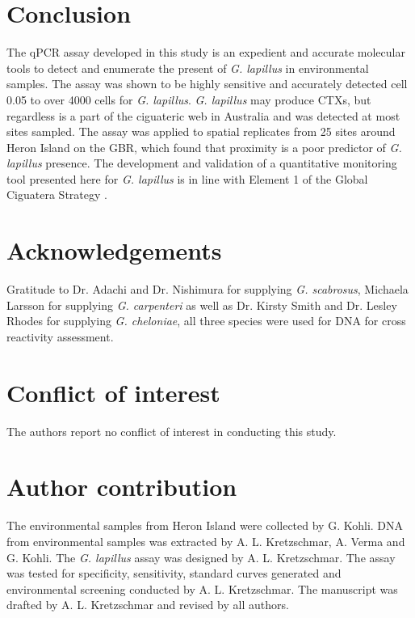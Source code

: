 \documentclass[12pt]{article}
\begin{document}
\section*{Conclusion}
The qPCR assay developed in this study is an expedient and accurate molecular tools to detect and enumerate the present of \emph{G. lapillus} %
in environmental samples. 
The assay was shown to be highly sensitive and accurately detected cell 0.05 to over 4000 cells for \emph{G. lapillus}. %
\emph{G. lapillus} may produce CTXs, but regardless is a part of the ciguateric web in Australia and was detected at most sites sampled.
The assay was applied to spatial replicates from 25 sites around Heron Island on the GBR, which found that proximity is a poor predictor of \textit{G. lapillus} presence. 
The development and validation of a quantitative monitoring tool presented here for \textit{G. lapillus} is in line with Element 1 of the Global Ciguatera Strategy \cite{globalcig}.

 \section*{Acknowledgements}
Gratitude to Dr. Adachi and Dr. Nishimura for supplying \emph{G. scabrosus}, Michaela Larsson for supplying \emph{G. carpenteri} as well as Dr. Kirsty Smith and Dr. Lesley Rhodes for supplying \emph{G. cheloniae}, all three species were used for DNA for cross reactivity assessment. 

\section*{Conflict of interest}
The authors report no conflict of interest in conducting this study.

\section*{Author contribution}
The environmental samples from Heron Island were collected by G. Kohli. 
DNA from environmental samples was extracted by A. L. Kretzschmar, A. Verma and G. Kohli. %
The \emph{G. lapillus} assay was designed by A. L. Kretzschmar. 
The assay was tested for specificity, sensitivity, standard curves generated and environmental screening conducted by A. L. Kretzschmar. 
The manuscript was drafted by A. L. Kretzschmar and revised by all authors.

\FloatBarrier
\newpage
%
%


\end{document}
